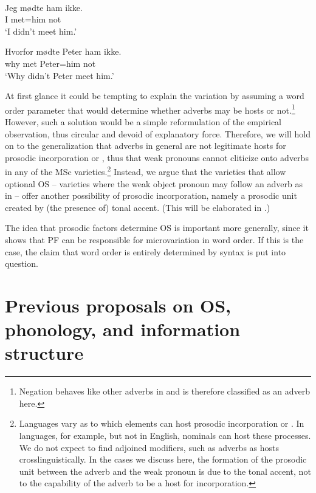 \documentclass[output=paper]{LSP/langsci}
\begin{document}
\ea \label{ex:erteschik:2}%
    \\ 
\ea 
\gll Jeg {mødte ham}   ikke. \\
          I      met=him     not\\
    \glt  ‘I didn’t meet him.' 

\ex 
\gll Hvorfor   mødte   {Peter ham}     ikke.\\
why        met       Peter=him     not\\
        \glt  ‘Why didn’t Peter meet him.'
\z
\z

At first glance it could be tempting to explain the variation by assuming a word order parameter that would determine whether adverbs may be hosts or not.\footnote{Negation behaves like other adverbs in  and is therefore classified as an adverb here.} However, such a solution would be a simple reformulation of the empirical observation, thus circular and devoid of explanatory {force}. Therefore, we will hold on to the generalization that adverbs in general are not legitimate hosts for prosodic incorporation or , thus that weak pronouns cannot cliticize onto adverbs in any of the MSc varieties.\footnote{Languages vary as to which elements can host prosodic incorporation or . In  languages, for example, but not in English, nominals can host these processes. We do not expect to find adjoined modifiers, such as adverbs as hosts crosslinguistically. In the cases we discuss here, the formation of the prosodic unit between the adverb and the weak pronoun is due to the tonal accent, not to the capability of the adverb to be a host for incorporation.}  Instead, we argue that the varieties that allow optional OS – varieties where the weak object pronoun may follow an adverb as in  – offer another possibility of  prosodic incorporation, namely a prosodic unit created by (the presence of) tonal accent. (This will be elaborated in .)

The idea that prosodic factors determine OS is important more generally, since it shows that PF can be responsible for microvariation in word order. If this is the case, the claim that word order is entirely determined by syntax is put into {question}.

\section{Previous proposals on OS, phonology, and information structure}\label{sec:erteschik:2}
\end{document}
